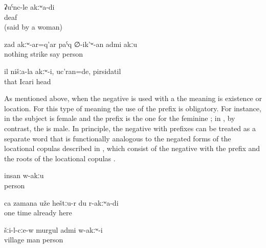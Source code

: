 \begin{exe}
	\ex	\label{ex:I am not deaf}
	\gll	ʡuˁnc-le	akːʷa-di\\
		deaf	\\
	\glt	{} (said by a woman)

	\ex	\label{ex:He is not the person who beats without anything}
	\gll	zad	akːʷ-ar=q'ar	paˁq	∅-ik'ʷ-an	admi	akːu\\
		nothing		strike	say	person	\\
	\glt	{}

	\ex	\label{ex:He was not one of us, he was Icari, the head (of the kolkhoz)}
	\gll	il	nišːa-la	akːʷ-i,		uc'ran=de,	pirsidatil\\
		that				Icari	head\\
	\glt	{}
\end{exe}

As mentioned above, when the negative  is used with a   the meaning is existence or location. For this type of meaning the use of the prefix is obligatory. For instance, in  the subject is female and the  prefix is the one for the feminine ; in , by contrast, the  is male. In principle, the negative  with  prefixes can be treated as a separate word that is functionally analogous to the negated forms of the locational copulas described in , which consist of the negative  with the  prefix and the roots of the locational copulas .

\begin{exe}
	\ex	\label{ex:Nobody is there}
	\gll	insan	w-akːu\\
		person	\\
	\glt	{}

	\ex	\label{ex:At one time I was already not there anymore}
	\gll	ca	zamana	uže	heštːu-r	du	r-akːʷa-di\\
		one	time	already	here		\\
	\glt	{}

	\ex	\label{ex:In the village there was no man}
	\gll	šːi-l-cːe-w	murgul	admi	w-akːʷ-i\\
		village	man	person	\\
	\glt	{}
\end{exe}

